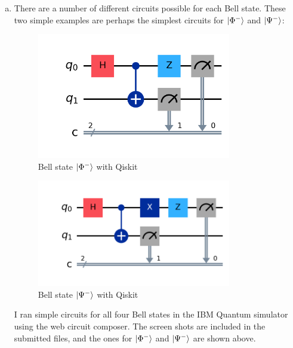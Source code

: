 \documentclass[12pt]{extarticle}
\begin{document}
\begin{enumerate}[(a)]
\item There are a number of different circuits possible for each Bell state.
These two simple examples are perhaps the simplest circuits for $\ket{\Phi^{-}}$ and $\ket{\Psi^{-}}$:

\begin{figure}[H]
\centering
\includegraphics[width=0.80\textwidth]{images/qiskit_phiminus.png}
\caption{Bell state $\ket{\Phi^{-}}$ with Qiskit}
\end{figure}
\begin{figure}[H]
\centering
\includegraphics[width=0.80\textwidth]{images/qiskit_psiminus.png}
\caption{Bell state $\ket{\Psi^{-}}$ with Qiskit}
\end{figure}

I ran simple circuits for all four Bell states in the IBM Quantum simulator using the web circuit composer.
The screen shots are included in the submitted files, and the ones for $\ket{\Phi^{-}}$ and $\ket{\Psi^{-}}$ are shown above.


\end{enumerate}
\end{document}
